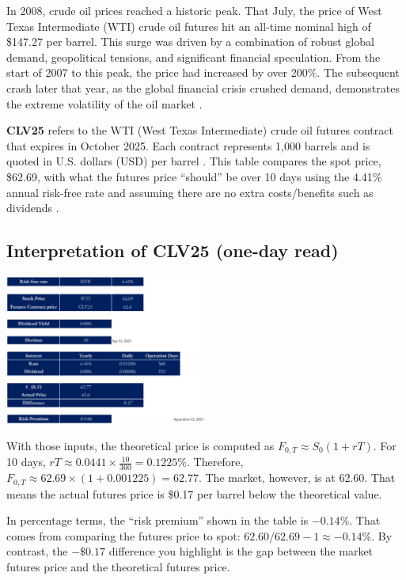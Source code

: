 \documentclass[10pt,a4paper]{article} %
\begin{document}
In 2008, crude oil prices reached a historic peak. That July, the price of West Texas Intermediate (WTI) crude oil futures hit an all-time nominal high of \$147.27 per barrel. This surge was driven by a combination of robust global demand, geopolitical tensions, and significant financial speculation. From the start of 2007 to this peak, the price had increased by over 200\%. The subsequent crash later that year, as the global financial crisis crushed demand, demonstrates the extreme volatility of the oil market \citep{reuters_oil_peak_2008,worldbank_oil_spike_2008}.

\textbf{CLV25} refers to the WTI (West Texas Intermediate) crude oil futures contract that expires in October 2025. Each contract represents 1{,}000 barrels and is quoted in U.S. dollars (USD) per barrel \citep{cme_cl_specs,cme_cl_calendar}.
This table compares the spot price, \$62.69, with what the futures price “should” be over 10 days using the 4.41\% annual risk-free rate and assuming there are no extra costs/benefits such as dividends \citep{frbny_sofr}.


\subsection{Interpretation of \texorpdfstring{CLV25}{CLV25} (one-day read)}
\begin{center}
\includegraphics[width=0.5\textwidth]{figures/wti.png}
\end{center}

With those inputs, the theoretical price is computed as $F_{0,T} \approx S_0(1 + rT)$. For 10 days, $rT \approx 0.0441 \times \frac{10}{360} = 0.1225\%$. Therefore, $F_{0,T} \approx 62.69 \times (1 + 0.001225) = 62.77$. The market, however, is at 62.60. That means the actual futures price is \$0.17 per barrel below the theoretical value.

In percentage terms, the “risk premium” shown in the table is $-0.14\%$. That comes from comparing the futures price to spot: $62.60/62.69 - 1 \approx -0.14\%$. By contrast, the $-\$0.17$ difference you highlight is the gap between the market futures price and the theoretical futures price.
\end{document}
